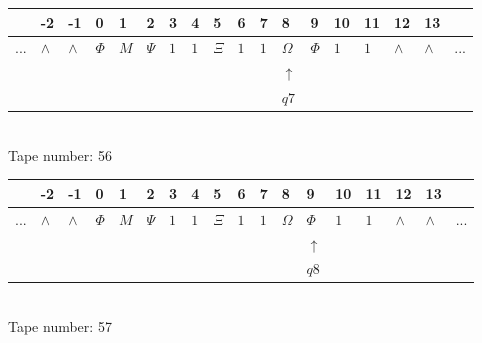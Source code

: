 \documentclass[11pt]{article}
\begin{document}
\begin{table}[H]
\centering
\begin{tabular}{llllllllllllllllll}
 & -2 & -1 & 0 & 1 & 2 & 3 & 4 & 5 & 6 & 7 & 8 & 9 & 10 & 11 & 12 & 13 & \\
\hline
$...$ & \multicolumn{1}{|l|}{$\wedge$} & \multicolumn{1}{|l|}{$\wedge$} & \multicolumn{1}{|l|}{$\Phi$} & \multicolumn{1}{|l|}{$M$} & \multicolumn{1}{|l|}{$\Psi$} & \multicolumn{1}{|l|}{$1$} & \multicolumn{1}{|l|}{$1$} & \multicolumn{1}{|l|}{$\Xi$} & \multicolumn{1}{|l|}{$1$} & \multicolumn{1}{|l|}{$1$} & \multicolumn{1}{|l|}{$\Omega$} & \multicolumn{1}{|l|}{$\Phi$} & \multicolumn{1}{|l|}{$1$} & \multicolumn{1}{|l|}{$1$} & \multicolumn{1}{|l|}{$\wedge$} & \multicolumn{1}{|l|}{$\wedge$} & $...$\\
\hline
&  &  &  &  &  &  &  &  &  &  & $\uparrow$ &  &  &  &  &  &  \\
&  &  &  &  &  &  &  &  &  &  & $ q7 $ &  &  &  &  &  &  \\
\end{tabular}
\\
Tape number: 56
\noindent\makebox[\linewidth]{\hdashrule{\textwidth}{1pt}{1pt}}\end{table}

\begin{table}[H]
\centering
\begin{tabular}{llllllllllllllllll}
 & -2 & -1 & 0 & 1 & 2 & 3 & 4 & 5 & 6 & 7 & 8 & 9 & 10 & 11 & 12 & 13 & \\
\hline
$...$ & \multicolumn{1}{|l|}{$\wedge$} & \multicolumn{1}{|l|}{$\wedge$} & \multicolumn{1}{|l|}{$\Phi$} & \multicolumn{1}{|l|}{$M$} & \multicolumn{1}{|l|}{$\Psi$} & \multicolumn{1}{|l|}{$1$} & \multicolumn{1}{|l|}{$1$} & \multicolumn{1}{|l|}{$\Xi$} & \multicolumn{1}{|l|}{$1$} & \multicolumn{1}{|l|}{$1$} & \multicolumn{1}{|l|}{$\Omega$} & \multicolumn{1}{|l|}{$\Phi$} & \multicolumn{1}{|l|}{$1$} & \multicolumn{1}{|l|}{$1$} & \multicolumn{1}{|l|}{$\wedge$} & \multicolumn{1}{|l|}{$\wedge$} & $...$\\
\hline
&  &  &  &  &  &  &  &  &  &  &  & $\uparrow$ &  &  &  &  &  \\
&  &  &  &  &  &  &  &  &  &  &  & $ q8 $ &  &  &  &  &  \\
\end{tabular}
\\
Tape number: 57
\noindent\makebox[\linewidth]{\hdashrule{\textwidth}{1pt}{1pt}}\end{table}
\end{document}
